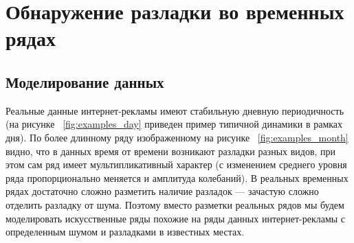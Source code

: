 \documentclass[%
12pt,
master,  %
natbib,      %
subf,        %
substylefile = spbu.rtx,
href,        %
colorlinks,  %
]{disser}
\begin{document}
%
%
%


\chapter{Обнаружение разладки во временных рядах}

\section{Моделирование данных}

Реальные данные интернет-рекламы имеют стабильную дневную периодичность (на рисунке ~\ref{fig:examples_day} приведен пример типичной динамики в рамках дня). По более длинному ряду изображенному на рисунке ~\ref{fig:examples_month} видно, что в данных время от времени возникают разладки разных видов, при этом сам ряд имеет мультипликативный характер (с изменением среднего уровня ряда пропорционально меняется и амплитуда колебаний). В реальных временных рядах достаточно сложно разметить наличие разладок --- зачастую сложно отделить разладку от шума. Поэтому вместо разметки реальных рядов мы будем моделировать искусственные ряды похожие на ряды данных интернет-рекламы с определенным шумом и разладками в известных местах.
\end{document}
